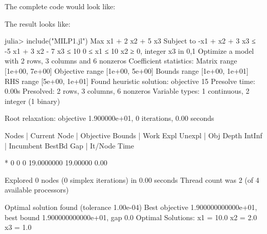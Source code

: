 The complete code would look like:
\begin{codelisting}
\end{codelisting}
The result looks like:
\begin{code}
julia> include("MILP1.jl")
Max x1 + 2 x2 + 5 x3
Subject to
 -x1 + x2 + 3 x3 ≤ -5
 x1 + 3 x2 - 7 x3 ≤ 10
 0 ≤ x1 ≤ 10
 x2 ≥ 0, integer
 x3 in {0,1}
Optimize a model with 2 rows, 3 columns and 6 nonzeros
Coefficient statistics:
  Matrix range    [1e+00, 7e+00]
  Objective range [1e+00, 5e+00]
  Bounds range    [1e+00, 1e+01]
  RHS range       [5e+00, 1e+01]
Found heuristic solution: objective 15
Presolve time: 0.00s
Presolved: 2 rows, 3 columns, 6 nonzeros
Variable types: 1 continuous, 2 integer (1 binary)

Root relaxation: objective 1.900000e+01, 0 iterations, 0.00 seconds

    Nodes    |    Current Node    |     Objective Bounds      |     Work
 Expl Unexpl |  Obj  Depth IntInf | Incumbent    BestBd   Gap | It/Node Time

*    0     0               0      19.0000000   19.00000  0.00%

Explored 0 nodes (0 simplex iterations) in 0.00 seconds
Thread count was 2 (of 4 available processors)

Optimal solution found (tolerance 1.00e-04)
Best objective 1.900000000000e+01, best bound 1.900000000000e+01, gap 0.0%
Optimal Solutions:
x1 = 10.0
x2 = 2.0
x3 = 1.0
\end{code}

